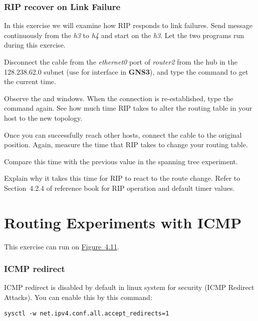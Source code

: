 \documentclass{../UTNetLab}
\begin{document}
\section{RIP recover on Link Failure}
    In this exercise we will examine how RIP responds to link failures.
    Send  message continuously from the \textit{h3} to \textit{h4} and start  on the \textit{h3}.
    Let the two programs run during this exercise.

    Disconnect the cable from the \textit{ethernet0} port of \textit{router2} from the hub in the 128.238.62.0 subnet (use  for interface in \textbf{GNS3}), and type the  command to get the current time.

    Observe the  and  windows.
    When the connection is re-established, type the  command again.
    See how much time RIP takes to alter the routing table in your host to the new topology.

    Once you can successfully reach other hosts, connect the cable to the original position.
    Again, measure the time that RIP takes to change your routing table.
    
    \begin{report}
        \item Compare this time with the previous value in the spanning tree experiment.

        \item Explain why it takes this time for RIP to react to the route change.
            Refer to Section~4.2.4 of reference book for RIP operation and default timer values.
    \end{report}


\part{Routing Experiments with ICMP}
    This exercise can run on \hyperref[fig:4.11]{Figure~4.11}.

\section{ICMP redirect}
    ICMP redirect is disabled by default in linux system for security (ICMP Redirect Attacks).
    You can enable this by this command:
    \begin{lstlisting}
sysctl -w net.ipv4.conf.all.accept_redirects=1
    \end{lstlisting}
\end{document}
